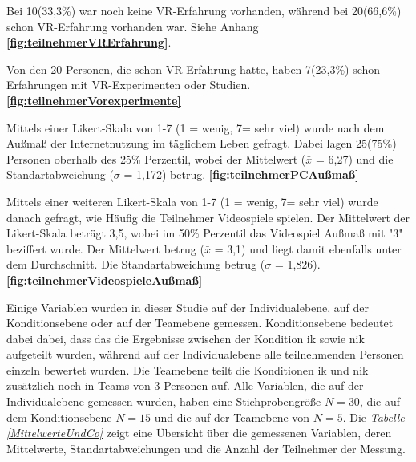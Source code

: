 \documentclass[a4paper,11pt]{article}%
\renewcommand{\\}{\vspace*{0.5\baselineskip} \newline}
\begin{document}
Bei 10(33,3\%) war noch keine VR-Erfahrung vorhanden, während bei 20(66,6\%) schon VR-Erfahrung vorhanden war. Siehe Anhang \textbf{\autoref{fig:teilnehmerVRErfahrung}}.

Von den 20 Personen, die schon VR-Erfahrung hatte, haben 7(23,3\%) schon Erfahrungen mit VR-Experimenten oder Studien. \textbf{\autoref{fig:teilnehmerVorexperimente}}

Mittels einer Likert-Skala von 1-7 (1 = wenig, 7= sehr viel) wurde nach dem Außmaß der Internetnutzung im täglichem Leben gefragt. Dabei lagen 25(75\%) Personen oberhalb des 25\% Perzentil, wobei der Mittelwert ($\bar{x}$ = 6,27) und die Standartabweichung ($\sigma$ = 1,172) betrug. \textbf{\autoref{fig:teilnehmerPCAußmaß}}
 
Mittels einer weiteren Likert-Skala von 1-7 (1 = wenig, 7= sehr viel) wurde danach gefragt, wie Häufig die Teilnehmer Videospiele spielen. Der Mittelwert der Likert-Skala beträgt 3,5, wobei im 50\% Perzentil das Videospiel Außmaß mit "3" beziffert wurde. Der Mittelwert betrug ($\bar{x}$ = 3,1) und liegt damit ebenfalls unter dem Durchschnitt. Die Standartabweichung betrug ($\sigma$ = 1,826). \textbf{\autoref{fig:teilnehmerVideospieleAußmaß}}

Einige Variablen wurden in dieser Studie auf der Individualebene, auf der Konditionsebene oder auf der Teamebene gemessen.
Konditionsebene bedeutet dabei dabei, dass das die Ergebnisse zwischen der Kondition \ac{ik} sowie \ac{nik} aufgeteilt wurden, während auf der Individualebene alle teilnehmenden Personen einzeln bewertet wurden. Die Teamebene teilt die Konditionen \ac{ik} und \ac{nik} zusätzlich noch in Teams von 3 Personen auf.  Alle Variablen, die auf der Individualebene gemessen wurden, haben eine Stichprobengröße $N = 30$, die auf dem Konditionsebene $ N = 15$ und die auf der Teamebene von $N = 5$.
Die \textit{Tabelle \ref{MittelwerteUndCo}} zeigt eine Übersicht über die gemessenen Variablen, deren Mittelwerte, Standartabweichungen und die Anzahl der Teilnehmer der Messung.

\newpage
\end{document}
